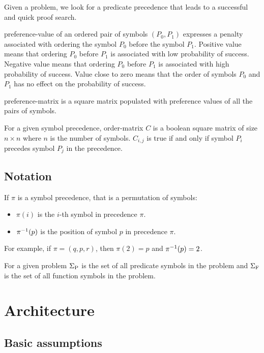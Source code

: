 Given a problem, we look for a predicate \gls{precedence} that leads to a successful and quick proof search.

\Gls{preference-value} of an ordered pair of symbols \((P_0, P_1)\) expresses a penalty associated with ordering the symbol \(P_0\) before the symbol \(P_1\).
Positive value means that ordering \(P_0\) before \(P_1\) is associated with low probability of success.
Negative value means that ordering \(P_0\) before \(P_1\) is associated with high probability of success.
Value close to zero means that the order of symbols \(P_0\) and \(P_1\) has no effect on the probability of success.

\Gls{preference-matrix} is a square matrix populated with preference values of all the pairs of symbols.

For a given symbol precedence,
\gls{order-matrix} \(C\) is a boolean square matrix of size \(n \times n\) where \(n\) is the number of symbols.
\(C_{i, j}\) is true if and only if symbol \(P_i\) precedes symbol \(P_j\) in the precedence.

\subsection{Notation}

If \(\pi\) is a symbol precedence, that is a permutation of symbols:

\begin{itemize}
	\item \(\pi(i)\) is the \(i\)-th symbol in precedence \(\pi\).
	\item \(\pi^{-1}(p)\) is the position of symbol \(p\) in precedence \(\pi\).
\end{itemize}

For example, if \(\pi = (q, p, r)\), then \(\pi(2) = p\) and \(\pi^{-1}(p) = 2\).

For a given problem \(\operatorname{\Sigma_P}\) is the set of all predicate symbols in the problem
and \(\operatorname{\Sigma_F}\) is the set of all function symbols in the problem.

\section{Architecture}

\subsection{Basic assumptions}

